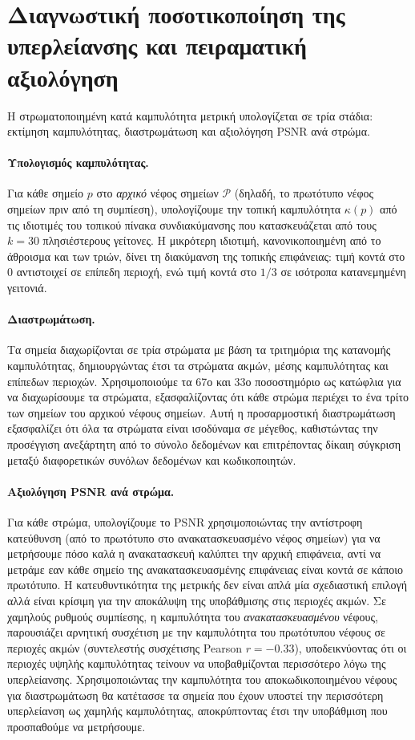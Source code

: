 \section{Διαγνωστική ποσοτικοποίηση της υπερλείανσης και πειραματική αξιολόγηση}
Η στρωματοποιημένη κατά καμπυλότητα μετρική υπολογίζεται σε τρία στάδια: εκτίμηση καμπυλότητας, διαστρωμάτωση και αξιολόγηση PSNR ανά στρώμα.

\paragraph{Υπολογισμός καμπυλότητας.}
Για κάθε σημείο $p$ στο \emph{αρχικό} νέφος σημείων $\mathcal{P}$ (δηλαδή, το πρωτότυπο νέφος σημείων πριν από τη συμπίεση),
υπολογίζουμε την τοπική καμπυλότητα $\kappa(p)$ από τις ιδιοτιμές του τοπικού πίνακα συνδιακύμανσης που κατασκευάζεται από τους $k=30$ πλησιέστερους γείτονες.
Η μικρότερη ιδιοτιμή, κανονικοποιημένη από το άθροισμα και των τριών, δίνει τη διακύμανση της τοπικής επιφάνειας:
τιμή κοντά στο 0 αντιστοιχεί σε επίπεδη περιοχή, ενώ τιμή κοντά στο $1/3$ σε ισότροπα κατανεμημένη γειτονιά.

\paragraph{Διαστρωμάτωση.}
Τα σημεία διαχωρίζονται σε τρία στρώματα με βάση τα τριτημόρια της κατανομής καμπυλότητας, δημιουργώντας έτσι τα στρώματα ακμών, μέσης καμπυλότητας και
επίπεδων περιοχών. Χρησιμοποιούμε τα 67ο και 33ο ποσοστημόριο ως κατώφλια για να διαχωρίσουμε τα στρώματα, εξασφαλίζοντας ότι κάθε στρώμα περιέχει το
ένα τρίτο των σημείων του αρχικού νέφους σημείων. Αυτή η προσαρμοστική διαστρωμάτωση εξασφαλίζει ότι όλα τα στρώματα είναι ισοδύναμα σε μέγεθος,
καθιστώντας την προσέγγιση ανεξάρτητη από το σύνολο δεδομένων και επιτρέποντας δίκαιη σύγκριση μεταξύ διαφορετικών συνόλων δεδομένων και κωδικοποιητών.

\paragraph{Αξιολόγηση PSNR ανά στρώμα.}
Για κάθε στρώμα, υπολογίζουμε το PSNR χρησιμοποιώντας την αντίστροφη κατεύθυνση (από το πρωτότυπο στο ανακατασκευασμένο νέφος σημείων) για να μετρήσουμε
πόσο καλά η ανακατασκευή καλύπτει την αρχική επιφάνεια, αντί να μετράμε εαν κάθε σημείο της ανακατασκευασμένης επιφάνειας είναι κοντά σε κάποιο πρωτότυπο.
Η κατευθυντικότητα της μετρικής δεν είναι απλά μία σχεδιαστική επιλογή αλλά είναι κρίσιμη για την αποκάλυψη της υποβάθμισης στις περιοχές ακμών.
Σε χαμηλούς ρυθμούς συμπίεσης, η καμπυλότητα του \emph{ανακατασκευασμένου} νέφους, παρουσιάζει αρνητική συσχέτιση με την καμπυλότητα του πρωτότυπου νέφους σε περιοχές
ακμών (συντελεστής συσχέτισης Pearson $r=-0.33$), υποδεικνύοντας ότι οι περιοχές υψηλής καμπυλότητας τείνουν να υποβαθμίζονται περισσότερο λόγω της υπερλείανσης.
Χρησιμοποιώντας την καμπυλότητα του αποκωδικοποιημένου νέφους για διαστρωμάτωση θα κατέτασσε τα σημεία που έχουν υποστεί την περισσότερη υπερλείανση ως χαμηλής καμπυλότητας,
αποκρύπτοντας έτσι την υποβάθμιση που προσπαθούμε να μετρήσουμε.

